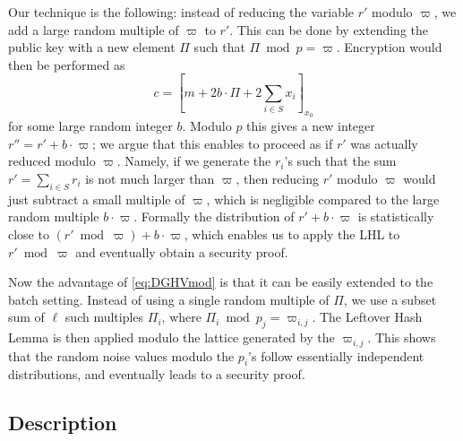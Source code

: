 \documentclass[11pt]{llncs}
\begin{document}
Our technique is the following: instead of reducing the variable $r'$
modulo $\varpi$, we add a large random multiple of $\varpi$ to $r'$. This
can be done by extending the public key with a new element $\varPi$ such
that $\varPi \bmod p=\varpi$. Encryption would then be performed as
\begin{equation}
\label{eq:DGHVmod}
c = \left[m + 2b \cdot \varPi+
  2\sum\limits_{i\in S} x_i\right]_{x_0}
\end{equation}
for some large random integer $b$. Modulo $p$ this gives a new integer
$r''=r' + b \cdot \varpi$; we argue that this enables to proceed as if
$r'$ was actually reduced modulo $\varpi$. Namely, if we generate the
$r_i$'s such that the sum $r'=\sum_{i \in S} r_i$ is not much larger than
$\varpi$, then reducing $r'$ modulo $\varpi$ would just subtract a
small multiple of $\varpi$, which is negligible compared to the large
random multiple $b \cdot \varpi$. Formally  the distribution of $r' + b
\cdot \varpi$ is statistically close to $(r' \bmod \varpi) + b \cdot
\varpi$, which enables us to apply the LHL to $r' \bmod \varpi$ and
eventually obtain a security proof.

Now the advantage of \eqref{eq:DGHVmod} is that it can be easily extended
to the batch setting. Instead of using a single random multiple of
$\varPi$, we use a subset sum of $\ell$ such multiples $\varPi_i$, where
$\varPi_i \bmod p_j=\varpi_{i,j}$. The Leftover Hash Lemma is then
applied modulo the lattice generated by the $\varpi_{i,j}$. This shows
that the random noise values modulo the $p_i$'s follow essentially
independent distributions, and eventually leads to a security proof. 

\subsection{Description}\label{subsec:description}
\end{document}
